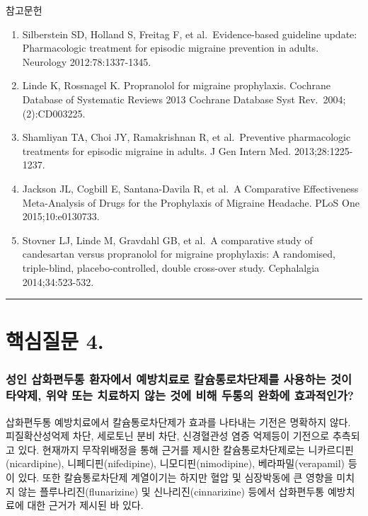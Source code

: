 \documentclass[]{book}
\begin{document}
참고문헌

\begin{enumerate}
\def\labelenumi{\arabic{enumi}.}
\item
  Silberstein SD, Holland S, Freitag F, et al.~Evidence-based guideline update: Pharmacologic treatment for episodic migraine prevention in adults. Neurology 2012:78:1337-1345.
\item
  Linde K, Rossnagel K. Propranolol for migraine prophylaxis. Cochrane Database of Systematic Reviews 2013 Cochrane Database Syst Rev.~2004;(2):CD003225.
\item
  Shamliyan TA, Choi JY, Ramakrishnan R, et al.~Preventive pharmacologic treatments for episodic migraine in adults. J Gen Intern Med. 2013;28:1225-1237.
\item
  Jackson JL, Cogbill E, Santana-Davila R, et al.~A Comparative Effectiveness Meta-Analysis of Drugs for the Prophylaxis of Migraine Headache. PLoS One 2015;10:e0130733.
\item
  Stovner LJ, Linde M, Gravdahl GB, et al.~A comparative study of candesartan versus propranolol for migraine prophylaxis: A randomised, triple-blind, placebo-controlled, double cross-over study. Cephalalgia 2014;34:523-532.
\end{enumerate}

\begin{center}\rule{0.5\linewidth}{\linethickness}\end{center}

\hypertarget{section-14}{%
\section{핵심질문 4.}\label{section-14}}

\hypertarget{section-15}{%
\subsubsection*{성인 삽화편두통 환자에서 예방치료로 칼슘통로차단제를 사용하는 것이 타약제, 위약 또는 치료하지 않는 것에 비해 두통의 완화에 효과적인가?}\label{section-15}}

삽화편두통 예방치료에서 칼슘통로차단제가 효과를 나타내는 기전은 명확하지 않다. 피질확산성억제 차단, 세로토닌 분비 차단, 신경혈관성 염증 억제등이 기전으로 추측되고 있다. 현재까지 무작위배정을 통해 근거를 제시한 칼슘통로차단제로는 니카르디핀(nicardipine), 니페디핀(nifedipine), 니모디핀(nimodipine), 베라파밀(verapamil) 등이 있다. 또한 칼슘통로차단제 계열이기는 하지만 혈압 및 심장박동에 큰 영향을 미치지 않는 플루나리진(flunarizine) 및 신나리진(cinnarizine) 등에서 삽화편두통 예방치료에 대한 근거가 제시된 바 있다.
\end{document}
